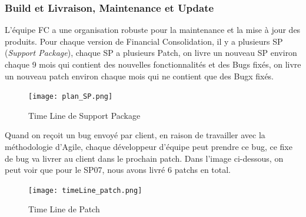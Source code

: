     \subsubsection{Build et Livraison, Maintenance et Update}
    L'équipe FC a une organisation robuste pour la maintenance et la mise à jour des produits. Pour chaque version de Financial Consolidation, il y a plusieurs SP (\textit{Support Package}), chaque SP a plusieurs Patch, on livre un nouveau SP environ chaque 9 mois qui contient des nouvelles fonctionnalités et des Bugs fixés, on livre un nouveau patch environ chaque mois qui ne contient que des Bugx fixés.
    \begin{figure}[H]
        \centering
        \texttt{[image: plan\_SP.png]}
        \caption{Time Line de Support Package}
        \label{fig:tileLine_sp}
    \end{figure}
    \par Quand on reçoit un bug envoyé par client,  en raison de travailler avec la méthodologie d'Agile, chaque développeur d'équipe peut prendre ce bug, ce fixe de bug va livrer au client dans le prochain patch. Dans l'image ci-dessous, on peut voir que pour le SP07, nous avons livré 6 patchs en total.
    
    \begin{figure}[H]
        \centering
        \texttt{[image: timeLine\_patch.png]}
        \caption{Time Line de Patch}
        \label{fig:timeLine_Path}
    \end{figure}
